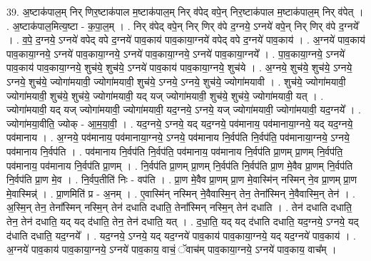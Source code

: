 \documentclass[17pt]{extarticle}
\begin{document}
39. अ॒ष्टाक॑पाल॒म् निर् णिर॒ष्टाक॑पाल म॒ष्टाक॑पाल॒म् निर् व॑पेद् वपे॒न् निर॒ष्टाक॑पाल म॒ष्टाक॑पाल॒म् निर् व॑पेत् । . अ॒ष्टाक॑पाल॒मित्य॒ष्टा - क॒पा॒ल॒म् । . निर् व॑पेद् वपे॒न् निर् णिर् व॑पे द॒ग्नये॒ ऽग्नये॑ वपे॒न् निर् णिर् व॑पे द॒ग्नये᳚ । . व॒पे॒ द॒ग्नये॒ ऽग्नये॑ वपेद् वपे द॒ग्नये॑ पाव॒काय॑ पाव॒काया॒ग्नये॑ वपेद् वपे द॒ग्नये॑ पाव॒काय॑ । . अ॒ग्नये॑ पाव॒काय॑ पाव॒काया॒ग्नये॒ ऽग्नये॑ पाव॒काया॒ग्नये॒ ऽग्नये॑ पाव॒काया॒ग्नये॒ ऽग्नये॑ पाव॒काया॒ग्नये᳚ । . पा॒व॒काया॒ग्नये॒ ऽग्नये॑ पाव॒काय॑ पाव॒काया॒ग्नये॒ शुच॑ये॒ शुच॑ये॒ ऽग्नये॑ पाव॒काय॑ पाव॒काया॒ग्नये॒ शुच॑ये । . अ॒ग्नये॒ शुच॑ये॒ शुच॑ये॒ ऽग्नये॒ ऽग्नये॒ शुच॑ये॒ ज्योगा॑मयावी॒ ज्योगा॑मयावी॒ शुच॑ये॒ ऽग्नये॒ ऽग्नये॒ शुच॑ये॒ ज्योगा॑मयावी । . शुच॑ये॒ ज्योगा॑मयावी॒ ज्योगा॑मयावी॒ शुच॑ये॒ शुच॑ये॒ ज्योगा॑मयावी॒ यद् यज् ज्योगा॑मयावी॒ शुच॑ये॒ शुच॑ये॒ ज्योगा॑मयावी॒ यत् । . ज्योगा॑मयावी॒ यद् यज् ज्योगा॑मयावी॒ ज्योगा॑मयावी॒ यद॒ग्नये॒ ऽग्नये॒ यज् ज्योगा॑मयावी॒ ज्योगा॑मयावी॒ यद॒ग्नये᳚ । . ज्योगा॑मया॒वीति॒ ज्योक् - आ॒म॒या॒वी॒ । . यद॒ग्नये॒ ऽग्नये॒ यद् यद॒ग्नये॒ पव॑मानाय॒ पव॑मानाया॒ग्नये॒ यद् यद॒ग्नये॒ पव॑मानाय । . अ॒ग्नये॒ पव॑मानाय॒ पव॑मानाया॒ग्नये॒ ऽग्नये॒ पव॑मानाय नि॒र्वप॑ति नि॒र्वप॑ति॒ पव॑मानाया॒ग्नये॒ ऽग्नये॒ पव॑मानाय नि॒र्वप॑ति । . पव॑मानाय नि॒र्वप॑ति नि॒र्वप॑ति॒ पव॑मानाय॒ पव॑मानाय नि॒र्वप॑ति प्रा॒णम् प्रा॒णम् नि॒र्वप॑ति॒ पव॑मानाय॒ पव॑मानाय नि॒र्वप॑ति प्रा॒णम् । . नि॒र्वप॑ति प्रा॒णम् प्रा॒णम् नि॒र्वप॑ति नि॒र्वप॑ति प्रा॒ण मे॒वैव प्रा॒णम् नि॒र्वप॑ति नि॒र्वप॑ति प्रा॒ण मे॒व । . नि॒र्वप॒तीति॑ निः - वप॑ति । . प्रा॒ण मे॒वैव प्रा॒णम् प्रा॒ण मे॒वास्मि॑न् नस्मिन् ने॒व प्रा॒णम् प्रा॒ण मे॒वास्मिन्न्॑ । . प्रा॒णमिति॑ प्र - अ॒नम् । . ए॒वास्मि॑न् नस्मिन् ने॒वैवास्मि॒न् तेन॒ तेना᳚स्मिन् ने॒वैवास्मि॒न् तेन॑ । . अ॒स्मि॒न् तेन॒ तेना᳚स्मिन् नस्मि॒न् तेन॑ दधाति दधाति॒ तेना᳚स्मिन् नस्मि॒न् तेन॑ दधाति । . तेन॑ दधाति दधाति॒ तेन॒ तेन॑ दधाति॒ यद् यद् द॑धाति॒ तेन॒ तेन॑ दधाति॒ यत् । . द॒धा॒ति॒ यद् यद् द॑धाति दधाति॒ यद॒ग्नये॒ ऽग्नये॒ यद् द॑धाति दधाति॒ यद॒ग्नये᳚ । . यद॒ग्नये॒ ऽग्नये॒ यद् यद॒ग्नये॑ पाव॒काय॑ पाव॒काया॒ग्नये॒ यद् यद॒ग्नये॑ पाव॒काय॑ । . अ॒ग्नये॑ पाव॒काय॑ पाव॒काया॒ग्नये॒ ऽग्नये॑ पाव॒काय॒ वाचं॒ ॅवाच॑म् पाव॒काया॒ग्नये॒ ऽग्नये॑ पाव॒काय॒ वाच᳚म् । \newline
\pagebreak
{}
\end{document}
